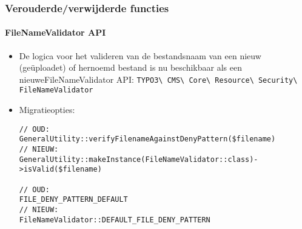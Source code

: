 
\begin{frame}[fragile]
	\frametitle{Verouderde/verwijderde functies}
	\framesubtitle{FileNameValidator API}

	\lstset{basicstyle=\tiny\ttfamily}

	\begin{itemize}
		\item De logica voor het valideren van de bestandsnaam van een nieuw (geüploadet) of
			hernoemd bestand is nu beschikbaar als een nieuweFileNameValidator API:\newline
			\small
				\texttt{TYPO3\textbackslash
					CMS\textbackslash
					Core\textbackslash
					Resource\textbackslash
					Security\textbackslash
					FileNameValidator}
			\normalsize

		\item Migratieopties:

\begin{lstlisting}
// OUD:
GeneralUtility::verifyFilenameAgainstDenyPattern($filename)
// NIEUW:
GeneralUtility::makeInstance(FileNameValidator::class)->isValid($filename)

// OUD:
FILE_DENY_PATTERN_DEFAULT
// NIEUW:
FileNameValidator::DEFAULT_FILE_DENY_PATTERN
\end{lstlisting}

	\end{itemize}

\end{frame}


